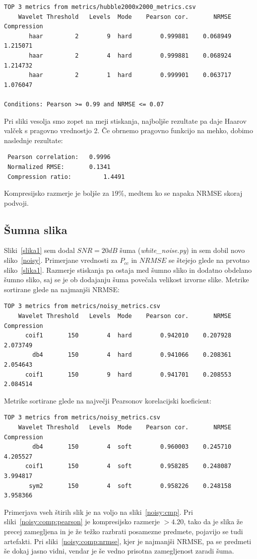 \documentclass[a4paper,11pt]{article}
\begin{document}
\begin{verbatim}
TOP 3 metrics from metrics/hubble2000x2000_metrics.csv
	Wavelet	Threshold	Levels	Mode 	Pearson cor.	   NRMSE 	Compression
	   haar	        2	     9	hard	    0.999881 	0.068949	   1.215071
	   haar	        2	     4	hard	    0.999881 	0.068924	   1.214732
	   haar	        2	     1	hard	    0.999901 	0.063717	   1.076047

Conditions: Pearson >= 0.99	and	NRMSE <= 0.07
\end{verbatim}
Pri sliki vesolja smo zopet na meji stiskanja, najboljše rezultate pa daje Haarov valček s pragovno vrednostjo 2. Če obrnemo pragovno funkcijo na mehko, dobimo naslednje rezultate:
\begin{verbatim}
 Pearson correlation:	0.9996
 Normalized RMSE: 		0.1341
 Compression ratio: 		1.4491
\end{verbatim}
Kompresijsko razmerje je boljše za $19\%$, medtem ko se napaka NRMSE skoraj podvoji.

\subsection{Šumna slika}

Sliki~\ref{slika1} sem dodal $SNR=20dB$ šuma (\textit{white\_noise.py}) in sem dobil novo sliko~\ref{noisy}. Primerjane vrednosti za $P_{cc}$ in $NRMSE$ se štejejo glede na prvotno sliko~\ref{slika1}. Razmerje stiskanja pa ostaja med šumno sliko in dodatno obdelano šumno sliko, saj se je ob dodajanju šuma povečala velikost izvorne slike.
Metrike sortirane glede na najmanjši NRMSE:
\begin{verbatim}
TOP 3 metrics from metrics/noisy_metrics.csv
	Wavelet	Threshold	Levels	Mode	Pearson cor.	   NRMSE 	Compression
	  coif1	      150	     4	hard	    0.942010 	0.207928	   2.073749
	    db4	      150	     4	hard	    0.941066 	0.208361	   2.054643
	  coif1	      150	     9	hard	    0.941701 	0.208553	   2.084514
\end{verbatim}
Metrike sortirane glede na največji Pearsonov korelacijski koeficient:
\begin{verbatim}
TOP 3 metrics from metrics/noisy_metrics.csv
	Wavelet	Threshold	Levels	Mode	Pearson cor.	   NRMSE 	Compression
	    db4	      150	     4	soft	    0.960003 	0.245710	   4.205527
	  coif1	      150	     4	soft	    0.958285 	0.248087	   3.994817
	   sym2	      150	     4	soft	    0.958226 	0.248158	   3.958366
\end{verbatim}
Primerjava vseh štirih slik je na voljo na sliki~\ref{noisy:cmp}. Pri sliki~\ref{noisy:comp:pearson} je kompresijsko razmerje $>4.20$, tako da je slika že precej zamegljena in je že težko razbrati posamezne predmete, pojavijo se tudi artefakti. Pri sliki~\ref{noisy:comp:nrmse}, kjer je najmanjši NRMSE, pa se predmeti še dokaj jasno vidni, vendar je še vedno prisotna zamegljenost zaradi šuma. 
\end{document}
